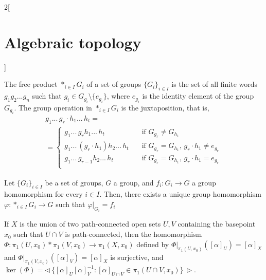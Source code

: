 \documentclass[../../../main_math.tex]{subfiles}
\begin{document}
\begin{multicols}{2}[\section{Algebraic topology}]
  \begin{definition}
    The free product $*_{i\in I}G_i$ of a set of groups $\{G_i\}_{i\in I}$ is the set of all finite words $g_1g_2...g_n$ such that $g_i\in G_{g_i}\setminus \{e_{g_i}\}$, where $e_{g_i}$ is the identity element of the group $G_{g_i}$.  The group operation in $*_{i\in I}G_i$ is the juxtaposition, that is,
    \begin{multline*}
      g_1...\,g_r \cdot h_1...\,h_t=\\
      = \begin{cases}
        g_1...\,g_rh_1...\,h_t            & \quad\text{if  } G_{g_r}\neq G_{h_1}                                   \\
        g_1...\,(g_r\cdot h_1)h_2...\,h_t & \quad\text{if } G_{g_r} = G_{h_1} \text{,  } g_r\cdot h_1 \neq e_{g_r} \\
        g_1...\,g_{r-1}h_2...\,h_t        & \quad\text{if } G_{g_r} = G_{h_1} \text{,  } g_r\cdot h_1 = e_{g_r}    \\
      \end{cases}
    \end{multline*}
  \end{definition}

  \begin{proposition}
    Let $\{G_i\}_{i\in I}$ be a set of groups, $G$ a group, and $f_i: G_i \to G$ a group homomorphism for every $i\in I$. Then, there exists a unique group homomorphism $\varphi: *_{i\in I}G_i \to G$ such that $\left.\varphi \right|_{G_i}=f_i$
  \end{proposition}

  \begin{theorem}
    If $X$ is the union of two path-connected open sets $U, V$ containing the basepoint $x_0$ such that $U\cap V$ is path-connected, then the homomorphism $\Phi : \pi_1(U, x_0)*\pi_1(V, x_0)\to \pi_1(X, x_0)$ defined by $\left.\Phi \right|_{\pi_1(U, x_0)}([\alpha]_U)=[\alpha]_X$ and  $\left.\Phi \right|_{\pi_1(V, x_0)}([\alpha]_V)=[\alpha]_X$ is surjective, and $\ker(\Phi)=\triangleleft\,\{[\alpha]_U[\alpha]_V^{-1} : [\alpha]_{U\cap V} \in \pi_1(U\cap V, x_0)\}\,\triangleright$.
  \end{theorem}

\end{multicols}
\end{document}

